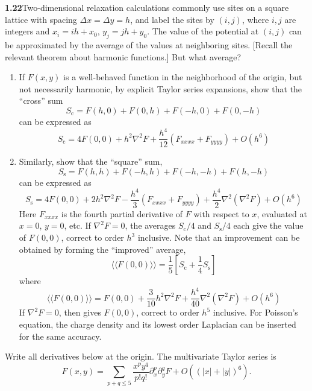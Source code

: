 \par\bigskip
\noindent\textbf{1.22}\quad Two-dimensional relaxation calculations commonly use sites on a square lattice with spacing $\Delta x=\Delta y=h$, and label the sites by $(i,j)$, where $i,j$ are integers and $x_{i}=ih+x_{0}$, $y_{j}=jh+y_{0}$. The value of the potential at $(i,j)$ can be approximated by the average of the values at neighboring sites. [Recall the relevant theorem about harmonic functions.] But what average?
\begin{enumerate}
\item[(a)] If $F(x,y)$ is a well-behaved function in the neighborhood of the origin, but not necessarily harmonic, by explicit Taylor series expansions, show that the ``cross'' sum
\[
S_{\mathrm{c}} = F(h,0)+F(0,h)+F(-h,0)+F(0,-h)
\]
can be expressed as
\[
S_{\mathrm{c}} = 4F(0,0)+h^{2}\nabla^{2}F+\frac{h^{4}}{12}\left(F_{xxxx}+F_{yyyy}\right)+O(h^{6})
\]
\item[(b)] Similarly, show that the ``square'' sum,
\[
S_{\mathrm{s}} = F(h,h)+F(-h,h)+F(-h,-h)+F(h,-h)
\]
can be expressed as
\[
S_{\mathrm{s}} = 4F(0,0)+2h^{2}\nabla^{2}F-\frac{h^{4}}{3}\left(F_{xxxx}+F_{yyyy}\right)+\frac{h^{4}}{2}\nabla^{2}(\nabla^{2}F)+O(h^{6})
\]
Here $F_{xxxx}$ is the fourth partial derivative of $F$ with respect to $x$, evaluated at $x=0$, $y=0$, etc. If $\nabla^{2}F=0$, the averages $S_{\mathrm{c}}/4$ and $S_{\mathrm{s}}/4$ each give the value of $F(0,0)$, correct to order $h^{3}$ inclusive. Note that an improvement can be obtained by forming the ``improved'' average,
\[
\langle\!\langle F(0,0)\rangle\!\rangle = \frac{1}{5}\left[S_{\mathrm{c}}+\frac{1}{4}S_{\mathrm{s}}\right]
\]
where
\[
\langle\!\langle F(0,0)\rangle\!\rangle = F(0,0)+\frac{3}{10}h^{2}\nabla^{2}F+\frac{h^{4}}{40}\nabla^{2}(\nabla^{2}F)+O(h^{6})
\]
If $\nabla^{2}F=0$, then  gives $F(0,0)$, correct to order $h^{5}$ inclusive. For Poisson's equation, the charge density and its lowest order Laplacian can be inserted for the same accuracy.
\end{enumerate}
\solution
Write all derivatives below at the origin. The multivariate Taylor series is
\[
F(x,y)=\sum_{p+q\le5}\frac{x^py^q}{p!q!}\partial_x^p\partial_y^qF
+O((|x|+|y|)^6).
\]

